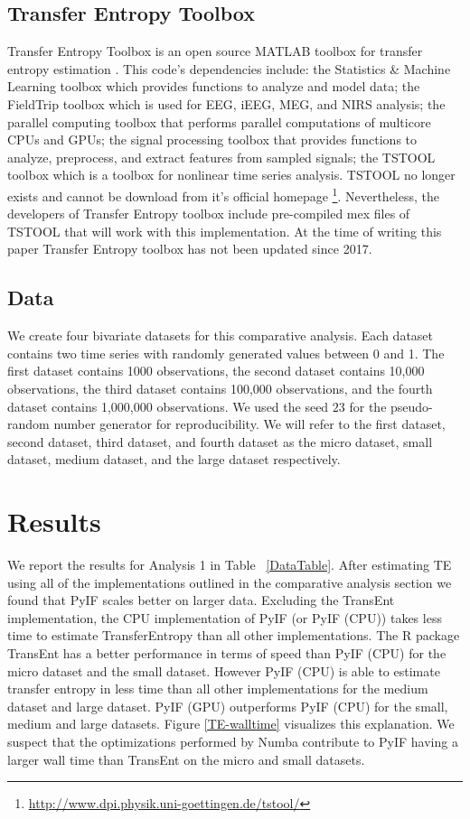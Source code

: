 \documentclass[conference]{IEEEtran}
\begin{document}
\subsection{Transfer Entropy Toolbox}

Transfer Entropy Toolbox  is an open source MATLAB toolbox for transfer entropy estimation \cite{TransferEntropyToolbox}. This code's dependencies include: the Statistics \& Machine Learning toolbox which provides functions to analyze and model data; the FieldTrip toolbox which is used for EEG, iEEG, MEG, and NIRS analysis; the parallel computing toolbox that performs parallel computations of multicore CPUs and GPUs; the signal processing toolbox that provides functions to analyze, preprocess, and extract features from sampled signals; the TSTOOL toolbox which is a toolbox for nonlinear time series analysis. TSTOOL no longer exists and cannot be download from it's official homepage \footnote{\url{http://www.dpi.physik.uni-goettingen.de/tstool/}}. Nevertheless, the developers of Transfer Entropy toolbox include pre-compiled mex files of TSTOOL that will work with this implementation. At the time of writing this paper Transfer Entropy toolbox has not been updated since 2017.

\subsection{Data}

We create four bivariate datasets for this comparative analysis. Each dataset contains two time series with randomly generated values between 0 and 1. The first dataset contains 1000 observations, the second dataset contains 10,000 observations, the third dataset contains 100,000 observations, and the fourth dataset contains 1,000,000 observations. We used the seed \(23\) for the pseudo-random number generator for reproducibility. We will refer to the first dataset, second dataset, third dataset, and fourth dataset as the micro dataset, small dataset, medium dataset, and the large dataset respectively.


\section{Results}

We report the results for Analysis 1 in Table ~\ref{DataTable}. After estimating TE using all of the implementations outlined in the comparative analysis section we found that PyIF scales better on larger data. Excluding the TransEnt implementation, the CPU implementation of PyIF (or PyIF (CPU)) takes less time to estimate TransferEntropy than all other implementations. The R package TransEnt has a better performance in terms of speed than PyIF (CPU) for the micro dataset and the small dataset. However PyIF (CPU) is able to estimate transfer entropy in less time than all other implementations for the medium dataset and large dataset. PyIF (GPU) outperforms PyIF (CPU) for the small, medium and large datasets. Figure \ref{TE-walltime} visualizes this explanation. We suspect that the optimizations performed by Numba contribute to PyIF having a larger wall time than TransEnt on the micro and small datasets.
\end{document}
